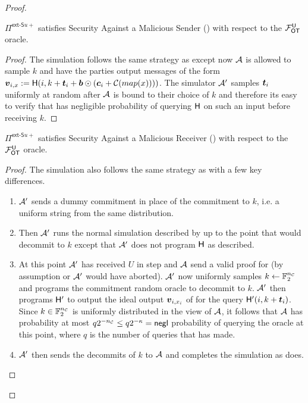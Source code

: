 \begin{proof}

	\begin{claim}\label{claim:ext-Su-U-MalSender}
		$\Pi^{\textsf{ext-S}u+}$ satisfies Security Against a Malicious Sender () with respect to the $\OOT^\U$ oracle.
	\end{claim}

	\begin{proof}
		The simulation follows the same strategy as  except now $\Adv$ is allowed to sample $k$ and have the parties output messages of the form $\vv_{i,x}:=\H(i, k + \tt_i + \bb \odot (\cc_i + \mathcal{C}(map(x))))$. The simulator $\Adv'$ samples $\tt_i$ uniformly at random after $\Adv$ is bound to their choice of $k$ and therefore its easy to verify that \Adv has negligible probability of querying $\H$ on such an input before receiving $k$.
	\end{proof}
	
	\begin{claim}\label{claim:ext-Su-U-MalReceiver}
		$\Pi^{\textsf{ext-S}u+}$ satisfies Security Against a Malicious Receiver () with respect to the $\OOT^\U$ oracle.
	\end{claim}
	\begin{proof}
		The simulation also follows the same strategy as  with a few key differences. 
		\begin{enumerate}
			\item $\Adv'$ sends a dummy commitment in place of the commitment to $k$, i.e. a uniform string from the same distribution.
			\item Then $\Adv'$ runs the normal simulation described by   up to the point that \send would decommit to $k$ except that $\Adv'$ does not program $\H$ as described.
			
			\item At this point $\Adv'$ has received $U$ in step  and $\Adv$ send a valid proof for  (by assumption or $\Adv'$ would have aborted). $\Adv'$ now uniformly samples $k\gets\mathbb{F}^\nc_2$ and programs the commitment random oracle to decommit to $k$. $\Adv'$ then programs $\H'$ to output the ideal output $\vv_{i,x_i}$ of \rec for the query $\H'(i,k + \tt_i)$. Since $k\in\mathbb{F}^\nc_2$ is uniformly distributed in the view of $\Adv$, it follows that $\Adv$ has probability at most $q 2^{-\nc}\leq q2^{-\kappa}=\negl$ probability of querying the oracle at this point, where $q$ is the number of queries that \Adv has made.
			\item $\Adv'$ then sends the decommits of $k$ to $\Adv$ and completes the simulation as  does.
		\end{enumerate} 
	\end{proof}
\end{proof}


